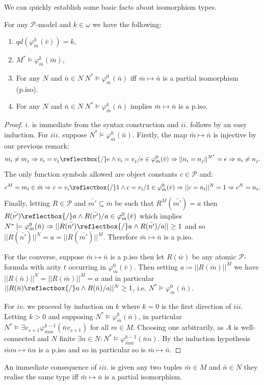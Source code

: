 \documentclass{lmcs} %
\newcommand{\?}{\ensuremath{\mkern0.4\thinmuskip}}
\newcommand{\und}{\mathord{\reflectbox{/}}}%
\let\phi=\varphi
\newcommand{\CP}{\mathcal{P}}
\begin{document}
We can quickly establish some basic facts about isomorphism types. 
\begin{lem}\label{lem:isotype}
    For any $\CP$-model and $k\in\omega$ we have the following:
    \begin{enumerate}[label=\roman*.)]
        \item $qd(\phi^k_{\bar{m}}(\bar{v}))=k$,
        \item $M^\ast\models\phi^k_{\bar{m}}(\bar{m})$,
        \item For any $N$ and $\bar{n}\in N\ N^\ast\models\phi^0_{\bar{m}}(\bar{n})$ iff $\bar{m}\mapsto\bar{n}$ is a partial isomorphism (p.iso).
        \item For any $N$ and $\bar{n}\in N\ N^\ast\models\phi^k_{\bar{m}}(\bar{n})$ implies $\bar{m}\mapsto\bar{n}$ is a p.iso. 
    \end{enumerate}
\end{lem}
\begin{proof}
    $i.$ is immediate from the syntax construction and $ii.$ follows by an easy induction. For $iii.$ suppose $N^\ast\models\phi^0_{\bar{m}}(\bar{n})$. Firstly, the map $\bar{m}\mapsto\bar{n}$ is injective by our previous remark: \[m_i\not=m_j \Rightarrow v_i=v_j\und e\land v_i=v_j/ e\in \phi^0_{\bar{m}}(\bar{v}) \Rightarrow ||n_i=n_j||^{N^\ast}=e \Rightarrow n_i\not=n_j.\] 
    The only function symbols allowed are object constants $c\in\CP$ and: \[c^M=m_i\in\bar{m} \Rightarrow c=v_i\und 1\land c=v_i/1\in\phi^0_{\bar{m}}(\bar{v})\Rightarrow ||c=n_i||^N=1\Rightarrow c^N=n_i.\]
    Finally, letting $R\in\CP$ and $\bar{m'}\subseteq \bar{m}$ be such that $R^M(\bar{m'})=a$ then $R(\bar{v'})\und a\land R(\bar{v'})/a\in \phi^0_{\bar{m}}(\bar{v})$ which implies $N^\ast\models \phi^0_{\bar{m}}(\bar{n})\Rightarrow ||R(\bar{n'})\und a\land R(\bar{n'})/a||\geq 1$ and so $||R(\bar{n'})||^N=a=||R(\bar{m'})||^M$. Therefore $\bar{m}\mapsto\bar{n}$ is a p.iso. 

    For the converse, suppose $\bar{m}\mapsto\bar{n}$ is a p.iso then let $R(\bar{w})$ be any atomic $\CP$-formula with arity $t$ occurring in $\phi^0_{\bar{m}}(\bar{v})$. Then setting $a\coloneqq ||R(\bar{m})||^M$ we have $||R(\bar{n})||^N=||R(\bar{m})||^M=a$ and in particular $||R(\bar{n})\und a\land R(\bar{n})/a||^N\geq 1$, i.e. $N^\ast\models\phi^0_{\bar{m}}(\bar{n})$.

    For $iv.$ we proceed by induction on $k$ where $k=0$ is the first direction of $iii.$ Letting $k>0$ and supposing $N^\ast\models\phi^k_{\bar{m}}(\bar{n})$, in particular $N^\ast\models\exists v_{s+1}\phi^{k-1}_{\bar{m}m}(\bar{n}v_{s+1})$ for all $m\in M$. Choosing one arbitrarily, as $A$ is well-connected and $N$ finite $\exists n\in N:N^\ast\models\phi^{k-1}_{\bar{m}m}(\bar{n}n)$. By the induction hypothesis $\bar{m}m\mapsto\bar{n}n$ is a p.iso and so in particular so is $\bar{m}\mapsto\bar{n}$.
\end{proof}
\begin{rem}
    An immediate consequence of $iii.$ is given any two tuples $\bar{m}\in M$ and $\bar{n}\in N$ they realise the same type iff $\bar{m}\mapsto\bar{n}$ is a partial isomorphism.  
\end{rem}
\end{document}
